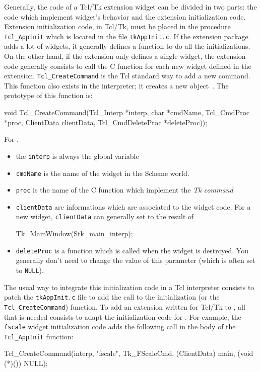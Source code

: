 \documentclass[10pt]{article}
\begin{document}
{Generally, the code of a Tcl/Tk extension widget can be divided in two
parts: the code which implement widget's behavior and the extension
initialization code. Extension initialization code, in Tcl/Tk, must be
placed in the procedure {\tt Tcl\_AppInit} which is located in the file
{\tt tkAppInit.c}. If the extension package adds a lot of widgets, it
generally defines a function to do all the initializations. On the
other hand, if the extension only defines a single widget, the
extension code generally consists to call the C function 
 for each new widget defined in the
extension. {\tt Tcl\_CreateCommand} is the Tcl standard way to add a
new command. This function also exists in the {\stk} interpreter; it
creates a new  object~\cite{Gallesio95-1}. The
prototype of this function is:
\begin{Code}
\begin{listing}[200]{2}
void Tcl_CreateCommand(Tcl_Interp *interp,
                       char *cmdName, 
                       Tcl_CmdProc *proc,
                       ClientData clientData,
                       Tcl_CmdDeleteProc *deleteProc));
\end{listing}
\end{Code}

For {\stk},
\begin{itemize}
\item the {\tt interp} is always the global variable
\item {\tt cmdName} is the name of the widget in the Scheme world.
\item {\tt proc} is the name of the C function which implement the {\em Tk command}
\item {\tt clientData} are informations which are associated to the
widget code. For a new widget, {\tt clientData} can generally set to 
the result of 
\begin{Code}
\begin{listing}[200]{2}
Tk_MainWindow(Stk_main_interp);
\end{listing}
\end{Code}
\item {\tt deleteProc} is a function which is called when the widget
is destroyed. You generally don't need to change the value of this
parameter (which is often set to {\tt NULL}). 
\end{itemize}

The usual way to integrate this initialization code in a Tcl interpreter
consists to patch the {\tt tkAppInit.c} file to add the call to the
initialization (or the {\tt Tcl\_CreateCommand}) function.
To add an extension written for Tcl/Tk to {\stk}, all that is needed
consists to adapt the initialization code for {\stk}. For example, the
{\tt fscale} widget initialization code adds the following call in the
body of the {\tt Tcl\_AppInit} function:
\begin{Code}
\begin{listing}[200]{2}
Tcl_CreateCommand(interp, "fscale", Tk_FScaleCmd, 
                  (ClientData) main, 
                  (void (*)()) NULL);
\end{listing}
\end{Code}

}
\end{document}
